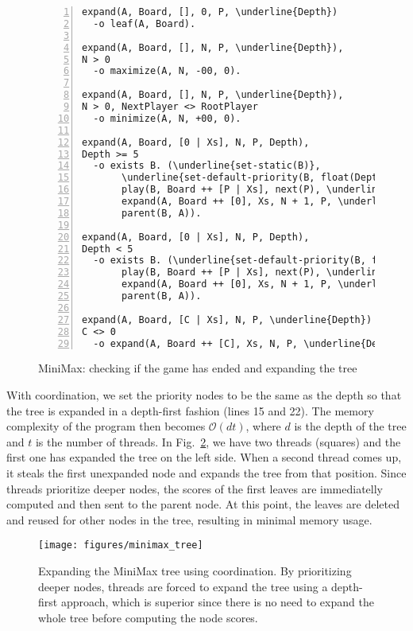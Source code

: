 \begin{figure}[h!]
\scriptsize\begin{Verbatim}[numbers=left,commandchars=\\\{\}]
expand(A, Board, [], 0, P, \underline{Depth})
  -o leaf(A, Board).

expand(A, Board, [], N, P, \underline{Depth}),
N > 0
  -o maximize(A, N, -00, 0).

expand(A, Board, [], N, P, \underline{Depth}),
N > 0, NextPlayer <> RootPlayer
  -o minimize(A, N, +00, 0).

expand(A, Board, [0 | Xs], N, P, Depth),
Depth >= 5
  -o exists B. (\underline{set-static(B)},
       \underline{set-default-priority(B, float(Depth + 1))},
       play(B, Board ++ [P | Xs], next(P), \underline{Depth + 1}),
       expand(A, Board ++ [0], Xs, N + 1, P, \underline{Depth}),
       parent(B, A)).

expand(A, Board, [0 | Xs], N, P, Depth),
Depth < 5
  -o exists B. (\underline{set-default-priority(B, float(Depth + 1))},
       play(B, Board ++ [P | Xs], next(P), \underline{Depth + 1}),
       expand(A, Board ++ [0], Xs, N + 1, P, \underline{Depth}),
       parent(B, A)).

expand(A, Board, [C | Xs], N, P, \underline{Depth})
C <> 0
  -o expand(A, Board ++ [C], Xs, N, P, \underline{Depth}).
\end{Verbatim}
\caption{MiniMax: checking if the game has ended and expanding the tree}
\label{minimax:check-end}
\end{figure}
\normalsize

With coordination, we set the priority nodes to be the same as the
depth so that the tree is expanded in a depth-first fashion (lines 15 and 22).
The memory complexity of the program then becomes $\mathcal{O}(d t)$, where $d$
is the depth of the tree and $t$ is the number of threads. In
Fig.~\ref{fig:minimax}, we have two threads (squares) and the first one has
expanded the tree on the left side. When a second thread comes up, it steals the
first unexpanded node and expands the tree from that position. Since threads
prioritize deeper nodes, the scores of the first leaves are immediatelly
computed and then sent to the parent node. At this point, the leaves are deleted
and reused for other nodes in the tree, resulting in minimal memory usage.

\begin{figure}[h!]
   \begin{center}
      \texttt{[image: figures/minimax\_tree]}
   \end{center}
   \caption{Expanding the MiniMax tree using coordination. By prioritizing
      deeper nodes, threads are forced to expand the tree using a depth-first
      approach, which is superior since there is no need to expand the whole
      tree before computing the node scores.}
   \label{fig:minimax}
\end{figure}

